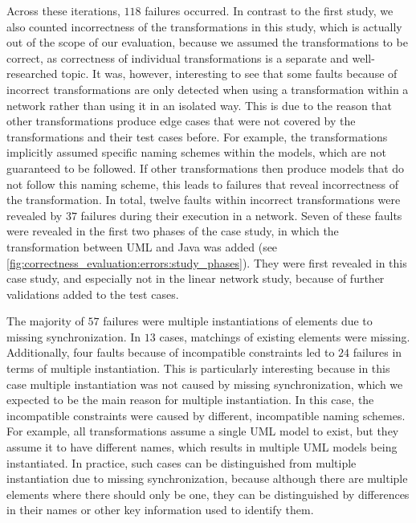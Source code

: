Across these iterations, $118$ failures occurred.
In contrast to the first study, we also counted incorrectness of the transformations in this study, which is actually out of the scope of our evaluation, because we assumed the transformations to be correct, as correctness of individual transformations is a separate and well-researched topic.
It was, however, interesting to see that some faults because of incorrect transformations are only detected when using a transformation within a network rather than using it in an isolated way.
This is due to the reason that other transformations produce edge cases that were not covered by the transformations and their test cases before.
For example, the transformations implicitly assumed specific naming schemes within the models, which are not guaranteed to be followed.
If other transformations then produce models that do not follow this naming scheme, this leads to failures that reveal incorrectness of the transformation.
In total, twelve faults within incorrect transformations were revealed by $37$ failures during their execution in a network.
Seven of these faults were revealed in the first two phases of the case study, in which the transformation between \gls{UML} and Java was added (see \autoref{fig:correctness_evaluation:errors:study_phases}).
They were first revealed in this case study, and especially not in the linear network study, because of further validations added to the test cases.

The majority of $57$ failures were multiple instantiations of elements due to missing synchronization. In $13$ cases, matchings of existing elements were missing.
Additionally, four faults because of incompatible constraints led to $24$ failures in terms of multiple instantiation.
This is particularly interesting because in this case multiple instantiation was not caused by missing synchronization, which we expected to be the main reason for multiple instantiation.
In this case, the incompatible constraints were caused by different, incompatible naming schemes.
For example, all transformations assume a single \gls{UML} model to exist, but they assume it to have different names, which results in multiple \gls{UML} models being instantiated.
In practice, such cases can be distinguished from multiple instantiation due to missing synchronization, because although there are multiple elements where there should only be one, they can be distinguished by differences in their names or other key information used to identify them.

